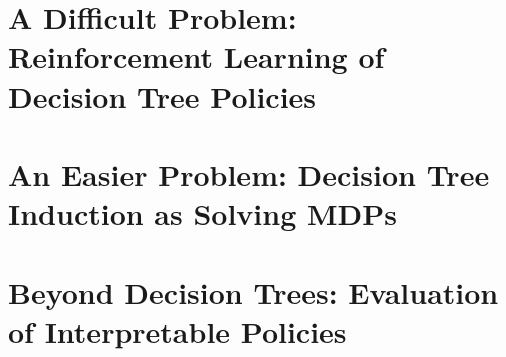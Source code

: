 \documentclass[11pt,space=onehalf,version=final]{yathesis}
\begin{document}
\part{A Difficult Problem: Reinforcement Learning of Decision Tree Policies}\label{part1}
% 

%



%

%
%
\part{An Easier Problem: Decision Tree Induction as Solving MDPs}\label{part2}
%

%

%



\part{Beyond Decision Trees: Evaluation of Interpretable Policies}\label{part3}





%
%
%
%

%
\printbibliography
%
\appendix
%





%
\backmatter
%
%
%
\tableofcontents
%
%
\end{document}
